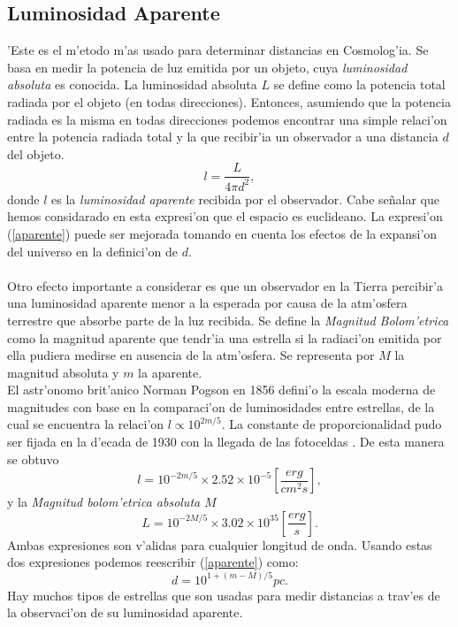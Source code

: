 \subsection{Luminosidad Aparente}
'Este es el m'etodo m'as usado para determinar distancias en Cosmolog'ia. Se basa en medir la potencia de luz emitida por un objeto,
cuya \textit{luminosidad absoluta} es conocida. La luminosidad absoluta $L$ se define como la potencia total radiada por el objeto 
(en todas direcciones). Entonces, asumiendo que la potencia radiada es la misma en todas direcciones podemos encontrar una simple 
relaci'on entre la potencia radiada total y la que recibir'ia un observador a una distancia $d$ del objeto.
\begin{equation}
l=\frac{L}{4\pi d^2}, \label{aparente}
\end{equation}
donde $l$ es la \textit{luminosidad aparente} recibida por el observador. Cabe se\~nalar que hemos considarado en esta 
expresi'on que el espacio es euclideano.
La expresi'on (\ref{aparente}) puede ser mejorada tomando en cuenta los efectos de la expansi'on del universo en la definici'on 
de $d$.\\ \\
Otro efecto importante a considerar es que un observador en la Tierra percibir'a una luminosidad aparente menor a la 
esperada por causa de la atm'osfera terrestre que absorbe parte de la luz recibida.
Se define la \textit{Magnitud Bolom'etrica} como la  magnitud aparente que tendr'ia una estrella si la radiaci'on
emitida por ella pudiera medirse en ausencia de la atm'osfera. Se representa por $M$ la magnitud absoluta y $m$ la aparente.\\
El astr'onomo brit'anico Norman Pogson en 1856 defini'o la escala moderna de magnitudes con base en la comparaci'on 
de luminosidades entre estrellas, de la cual se encuentra la relaci'on $l \propto 10^{2m/5}$. La constante 
de proporcionalidad pudo ser fijada en la d'ecada de 1930 con la llegada de las fotoceldas \cite{Hubble2}. 
De esta manera se obtuvo
\begin{equation}
l=10^{-2m/5}\times 2.52 \times 10^{-5} \left [\frac{erg}{cm^{2}s}\right ],
\end{equation}
 y la \textit{Magnitud bolom'etrica absoluta} $M$ 
\begin{equation}
L=10^{-2M/5}\times 3.02 \times 10^{35} \left [ \frac{erg}{s}\right ].
\end{equation}
Ambas expresiones son v'alidas para cualquier longitud de onda. Usando estas dos expresiones podemos reescribir (\ref{aparente}) como:
\begin{equation}
d=10^{1+(m-M)/5}pc.    \label{d}
\end{equation}
Hay muchos tipos de estrellas que son usadas para medir distancias a trav'es de la observaci'on de su luminosidad aparente.
